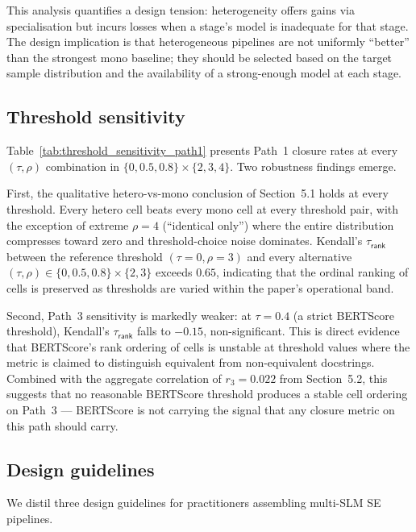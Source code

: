 This analysis quantifies a design tension: heterogeneity offers gains via specialisation but incurs losses when a stage's model is inadequate for that stage. The design implication is that heterogeneous pipelines are not uniformly ``better'' than the strongest mono baseline; they should be selected based on the target sample distribution and the availability of a strong-enough model at each stage.

\subsection{Threshold sensitivity}



Table~\ref{tab:threshold_sensitivity_path1} presents Path~1 closure rates at every $(\tau, \rho)$ combination in $\{0, 0.5, 0.8\} \times \{2, 3, 4\}$. Two robustness findings emerge.

First, the qualitative hetero-vs-mono conclusion of Section~5.1 holds at every threshold. Every hetero cell beats every mono cell at every threshold pair, with the exception of extreme $\rho = 4$ (``identical only'') where the entire distribution compresses toward zero and threshold-choice noise dominates. Kendall's $\tau_{\textsf{rank}}$ between the reference threshold $(\tau = 0, \rho = 3)$ and every alternative $(\tau, \rho) \in \{0, 0.5, 0.8\} \times \{2, 3\}$ exceeds $0.65$, indicating that the ordinal ranking of cells is preserved as thresholds are varied within the paper's operational band.

Second, Path~3 sensitivity is markedly weaker: at $\tau = 0.4$ (a strict BERTScore threshold), Kendall's $\tau_{\textsf{rank}}$ falls to $-0.15$, non-significant. This is direct evidence that BERTScore's rank ordering of cells is unstable at threshold values where the metric is claimed to distinguish equivalent from non-equivalent docstrings. Combined with the aggregate correlation of $r_3 = 0.022$ from Section~5.2, this suggests that no reasonable BERTScore threshold produces a stable cell ordering on Path~3 --- BERTScore is not carrying the signal that any closure metric on this path should carry.

\subsection{Design guidelines}

We distil three design guidelines for practitioners assembling multi-SLM SE pipelines.

